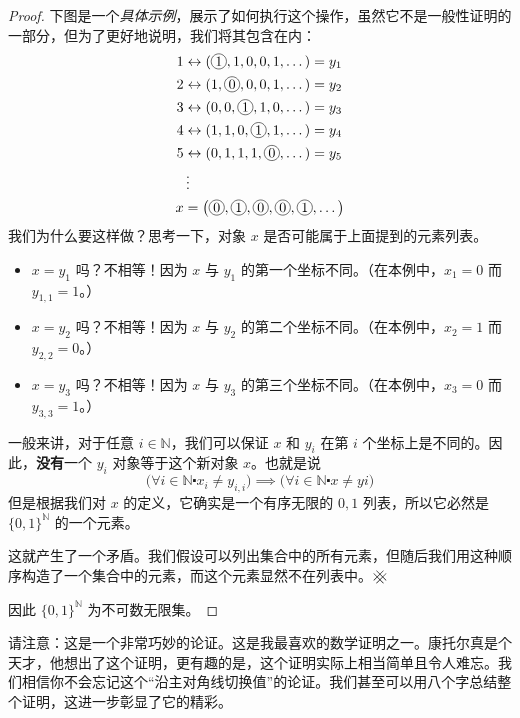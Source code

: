 \begin{proof}
    下图是一个\emph{具体示例}，展示了如何执行这个操作，虽然它不是一般性证明的一部分，但为了更好地说明，我们将其包含在内：
    \begin{align*}
        1 & \leftrightarrow (\circled{1} , 1 , 0 , 0 , 1 , \dots) = y_1                        \\
        2 & \leftrightarrow (1 , \circled{0} , 0 , 0 , 1 , \dots) = y_2                        \\
        3 & \leftrightarrow (0 , 0 , \circled{1} , 1 , 0 , \dots) = y_3                        \\
        4 & \leftrightarrow (1 , 1 , 0 , \circled{1} , 1 , \dots) = y_4                        \\
        5 & \leftrightarrow (0 , 1 , 1 , 1 , \circled{0} , \dots) = y_5                        \\
          & \vdots                                                                             \\
        x & =\big(\circled{0}, \circled{1}, \circled{0}, \circled{0}, \circled{1}, \dots \big)
    \end{align*}
    我们为什么要这样做？思考一下，对象 $x$ 是否可能属于上面提到的元素列表。
    \begin{itemize}
        \item $x = y_1$ 吗？不相等！因为 $x$ 与 $y_1$ 的第一个坐标不同。（在本例中，$x_1=0$ 而 $y_{1,1} = 1$。）
        \item $x = y_2$ 吗？不相等！因为 $x$ 与 $y_2$ 的第二个坐标不同。（在本例中，$x_2=1$ 而 $y_{2,2} = 0$。）
        \item $x = y_3$ 吗？不相等！因为 $x$ 与 $y_3$ 的第三个坐标不同。（在本例中，$x_3=0$ 而 $y_{3,3} = 1$。）
    \end{itemize}
    一般来讲，对于任意 $i \in \mathbb{N}$，我们可以保证 $x$ 和 $y_i$ 在第 $i$ 个坐标上是不同的。因此，\textbf{没有}一个 $y_i$ 对象等于这个新对象 $x$。也就是说
    \[\big(\forall i \in \mathbb{N} \centerdot x_i \ne y_{i,i}\big) \implies \big(\forall i \in \mathbb{N} \centerdot x \ne yi\big)\]
    但是根据我们对 $x$ 的定义，它确实是一个有序无限的 $0, 1$ 列表，所以它必然是 $\{0, 1\}^{\mathbb{N}}$ 的一个元素。

    这就产生了一个矛盾。我们假设可以列出集合中的所有元素，但随后我们用这种顺序构造了一个集合中的元素，而这个元素显然不在列表中。$\hashx$

    因此 $\{0, 1\}^{\mathbb{N}}$ 为不可数无限集。
\end{proof}

请注意：这是一个非常巧妙的论证。这是我最喜欢的数学证明之一。康托尔真是个天才，他想出了这个证明，更有趣的是，这个证明实际上相当简单且令人难忘。我们相信你不会忘记这个``沿主对角线切换值''的论证。我们甚至可以用八个字总结整个证明，这进一步彰显了它的精彩。

